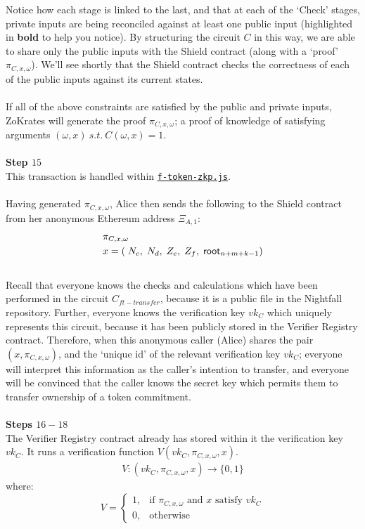 Notice how each stage is linked to the last, and that at each of the `Check' stages, private inputs are being reconciled against at least one public input (highlighted in \textbf{bold} to help you notice). By structuring the circuit $C$ in this way, we are able to share only the public inputs with the Shield contract (along with a `proof' $\pi_{C,x,\omega}$). We'll see shortly that the Shield contract checks the correctness of each of the public inputs against its current states.\\
\\

\noindent
If all of the above constraints are satisfied by the public and private inputs, ZoKrates will generate the proof $\pi_{C,x,\omega}$; a proof of knowledge of satisfying arguments $(\omega, x) \ s.t. \ C(\omega, x) = 1$.\\
\\

\textbf{Step $15$}
\ \\
This transaction is handled within \hyperref[sec:f-token-zkp]{\texttt{f-token-zkp.js}}.\\
\\
Having generated $\pi_{C,x,\omega}$, Alice then sends the following to the Shield contract from her anonymous Ethereum address $\Xi_{A,1}$:
\begin{align*}
  &\pi_{C,x,\omega}\\
  &x = (\;N_c,\;N_d,\;Z_e,\;Z_f,\;\mathsf{root}_{n+m+k-1})
\end{align*}
\\
Recall that everyone knows the checks and calculations which have been performed in the circuit $C_{ft-transfer}$, because it is a public file in the Nightfall repository. Further, everyone knows the verification key $vk_C$ which uniquely represents this circuit, because it has been publicly stored in the Verifier Registry contract. Therefore, when this anonymous caller (Alice) shares the pair $(x, \pi_{C,x,\omega})$, and the `unique id' of the relevant verification key $vk_C$; everyone will interpret this information as the caller's intention to transfer, and everyone will be convinced that the caller knows the secret key which permits them to transfer ownership of a token commitment.\\
\\



\textbf{Steps $16 - 18$}
\ \\
The Verifier Registry contract already has stored within it the verification key $vk_C$.
It runs a verification function $V(vk_C, \pi_{C,x,\omega}, x)$.
\begin{align*}
  V: (vk_C, \pi_{C,x,\omega}, x) \to \{0,1\}
\end{align*}
where:
\[
    V=
\begin{cases}
    1,& \text{if } \pi_{C,x,\omega} \text{ and } x \text{ satisfy } vk_C\\
    0,& \text{otherwise}
\end{cases}
\]
\ \\



